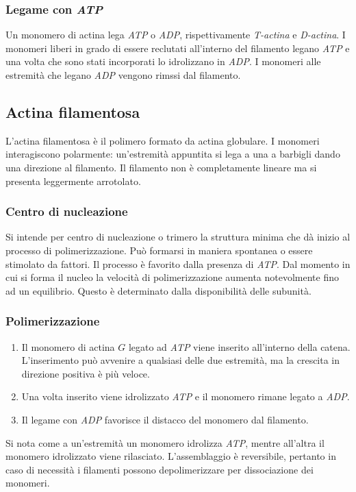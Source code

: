 		\subsubsection{Legame con \emph{ATP}}
		Un monomero di actina lega \emph{ATP} o \emph{ADP}, rispettivamente \emph{T-actina} e \emph{D-actina}.
		I monomeri liberi in grado di essere reclutati all'interno del filamento legano \emph{ATP} e una volta che sono stati incorporati lo idrolizzano in \emph{ADP}.
		I monomeri alle estremit\`a che legano \emph{ADP} vengono rimssi dal filamento.

	\subsection{Actina filamentosa}
	L'actina filamentosa \`e il polimero formato da actina globulare.
	I monomeri interagiscono polarmente: un'estremit\`a appuntita si lega a una a barbigli dando una direzione al filamento.
	Il filamento non \`e completamente lineare ma si presenta leggermente arrotolato.


		\subsubsection{Centro di nucleazione}
		Si intende per centro di nucleazione o trimero la struttura minima che d\`a inizio al processo di polimerizzazione.
		Pu\`o formarsi in maniera spontanea o essere stimolato da fattori.
		Il processo \`e favorito dalla presenza di \emph{ATP}.
		Dal momento in cui si forma il nucleo la velocit\`a di polimerizzazione aumenta notevolmente fino ad un equilibrio.
		Questo \`e determinato dalla disponibilit\`a delle subunit\`a.
		
		\subsubsection{Polimerizzazione}
		\begin{multicols}{2}
			\begin{enumerate}
				\item Il monomero di actina $G$ legato ad \emph{ATP} viene inserito all'interno della catena.
					L'inserimento pu\`o avvenire a qualsiasi delle due estremit\`a, ma la crescita in direzione positiva \`e pi\`u veloce.
				\item Una volta inserito viene idrolizzato \emph{ATP} e il monomero rimane legato a \emph{ADP}.
				\item Il legame con \emph{ADP} favorisce il distacco del monomero dal filamento.
			\end{enumerate}
		\end{multicols}
		Si nota come a un'estremit\`a un monomero idrolizza \emph{ATP}, mentre all'altra il monomero idrolizzato viene rilasciato.
		L'assemblaggio \`e reversibile, pertanto in caso di necessit\`a i filamenti possono depolimerizzare per dissociazione dei monomeri.
		
